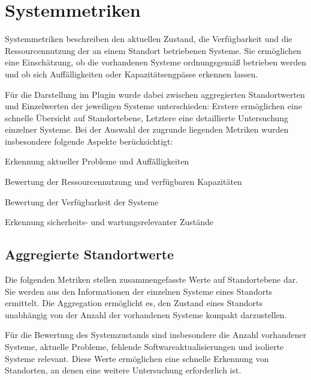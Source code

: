 \section{Systemmetriken}
\label{sec:systemmetriken}

Systemmetriken beschreiben den aktuellen Zustand, die Verfügbarkeit und
die Ressourcennutzung der an einem Standort betriebenen Systeme. Sie
ermöglichen eine Einschätzung, ob die vorhandenen Systeme ordnungsgemäß
betrieben werden und ob sich Auffälligkeiten oder Kapazitätsengpässe
erkennen lassen.

Für die Darstellung im Plugin wurde dabei zwischen aggregierten
Standortwerten und Einzelwerten der jeweiligen Systeme unterschieden:
Erstere ermöglichen eine schnelle Übersicht auf Standortebene, Letztere
eine detaillierte Untersuchung einzelner Systeme. Bei der Auswahl der
zugrunde liegenden Metriken wurden insbesondere folgende Aspekte
berücksichtigt:

\begin{compactitem}
    \item Erkennung aktueller Probleme und Auffälligkeiten
    \item Bewertung der Ressourcennutzung und verfügbaren Kapazitäten
    \item Bewertung der Verfügbarkeit der Systeme
    \item Erkennung sicherheits- und wartungsrelevanter Zustände
\end{compactitem}

\subsection{Aggregierte Standortwerte}
\label{subsec:system-aggregierte-werte}

Die folgenden Metriken stellen zusammengefasste Werte auf Standortebene
dar. Sie werden aus den Informationen der einzelnen Systeme eines
Standorts ermittelt. Die Aggregation ermöglicht es, den Zustand eines
Standorts unabhängig von der Anzahl der vorhandenen Systeme kompakt
darzustellen.

Für die Bewertung des Systemzustands sind insbesondere die Anzahl
vorhandener Systeme, aktuelle Probleme, fehlende Softwareaktualisierungen
und isolierte Systeme relevant. Diese Werte ermöglichen eine schnelle
Erkennung von Standorten, an denen eine weitere Untersuchung erforderlich
ist.


